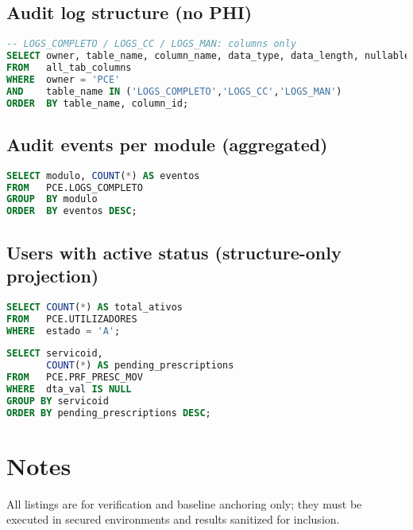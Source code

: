 \subsection*{Audit log structure (no PHI)}
\begin{lstlisting}[language=SQL]
-- LOGS_COMPLETO / LOGS_CC / LOGS_MAN: columns only
SELECT owner, table_name, column_name, data_type, data_length, nullable
FROM   all_tab_columns
WHERE  owner = 'PCE'
AND    table_name IN ('LOGS_COMPLETO','LOGS_CC','LOGS_MAN')
ORDER  BY table_name, column_id;
\end{lstlisting}

\subsection*{Audit events per module (aggregated)}
\begin{lstlisting}[language=SQL]
SELECT modulo, COUNT(*) AS eventos
FROM   PCE.LOGS_COMPLETO
GROUP  BY modulo
ORDER  BY eventos DESC;
\end{lstlisting}

\subsection*{Users with active status (structure-only projection)}
\begin{lstlisting}[language=SQL]
SELECT COUNT(*) AS total_ativos
FROM   PCE.UTILIZADORES
WHERE  estado = 'A';
\end{lstlisting}
\begin{lstlisting}[language=SQL]
SELECT servicoid,
       COUNT(*) AS pending_prescriptions
FROM   PCE.PRF_PRESC_MOV
WHERE  dta_val IS NULL
GROUP BY servicoid
ORDER BY pending_prescriptions DESC;
\end{lstlisting}

\section{Notes}
All listings are for verification and baseline anchoring only; they must be executed in secured environments and results sanitized for inclusion.